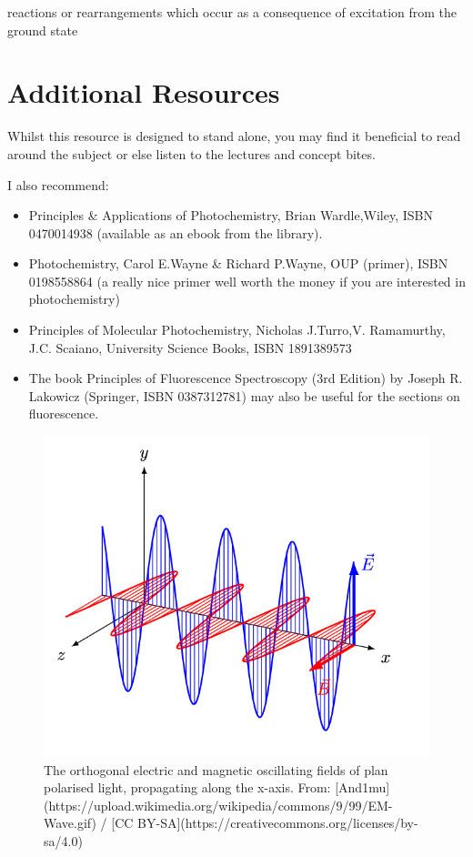 \documentclass[
]{book}
\providecommand{\tightlist}{%
  \setlength{\itemsep}{0pt}\setlength{\parskip}{0pt}}
\begin{document}
reactions or rearrangements which occur as a consequence of excitation from the ground state

\hypertarget{sec:AddnRes}{%
\section{Additional Resources}\label{sec:AddnRes}}

Whilst this resource is designed to stand alone, you may find it beneficial to read around the subject or else listen to the lectures and concept bites.

I also recommend:

\begin{itemize}
\tightlist
\item
  Principles \& Applications of Photochemistry, Brian Wardle,Wiley, ISBN 0470014938 (available as an ebook from the library).
\item
  Photochemistry, Carol E.Wayne \& Richard P.Wayne, OUP (primer), ISBN 0198558864 (a really nice primer well worth the money if you are interested in photochemistry)
\item
  Principles of Molecular Photochemistry, Nicholas J.Turro,V. Ramamurthy, J.C. Scaiano, University Science Books, ISBN 1891389573
\item
  The book Principles of Fluorescence Spectroscopy (3rd Edition) by Joseph R. Lakowicz (Springer, ISBN 0387312781) may also be useful for the sections on fluorescence.
\end{itemize}

\begin{figure}
\includegraphics[width=0.6\linewidth]{images/EM-Wave} \caption{The orthogonal electric and magnetic oscillating fields of plan polarised light, propagating along the x-axis. From: [And1mu](https://upload.wikimedia.org/wikipedia/commons/9/99/EM-Wave.gif) / [CC BY-SA](https://creativecommons.org/licenses/by-sa/4.0)}\label{fig:EMWave}
\end{figure}
\end{document}
